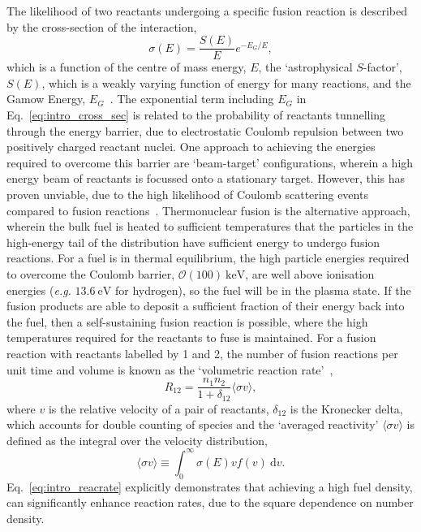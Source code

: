 The likelihood of two reactants undergoing a specific fusion reaction is described by the cross-section of the interaction,
\begin{equation}
    \label{eq:intro_cross_sec}
    \sigma(E) = \frac{S(E)}{E} e^{-E_G/E},
\end{equation}
which is a function of the centre of mass energy, $E$, the `astrophysical $S$-factor', $S(E)$, which is a weakly varying function of energy for many reactions, and the Gamow Energy, $E_G$~\cite{atzeni_physics_2004}.
The exponential term including $E_G$ in Eq.~\ref{eq:intro_cross_sec} is related to the probability of reactants tunnelling through the energy barrier, due to electrostatic Coulomb repulsion between two positively charged reactant nuclei.
One approach to achieving the energies required to overcome this barrier are `beam-target' configurations, wherein a high energy beam of reactants is focussed onto a stationary target.
However, this has proven unviable, due to the high likelihood of Coulomb scattering events compared to fusion reactions~\cite{rider_general_1995}.
Thermonuclear fusion is the alternative approach, wherein the bulk fuel is heated to sufficient temperatures that the particles in the high-energy tail of the distribution have sufficient energy to undergo fusion reactions.
For a fuel is in thermal equilibrium, the high particle energies required to overcome the Coulomb barrier, $\mathcal{O}(100)\ \text{keV}$, are well above ionisation energies (\textit{e.g. }$13.6\ \text{eV}$ for hydrogen), so the fuel will be in the plasma state.
If the fusion products are able to deposit a sufficient fraction of their energy back into the fuel, then a self-sustaining fusion reaction is possible, where the high temperatures required for the reactants to fuse is maintained.
For a fusion reaction with reactants labelled by 1 and 2, the number of fusion reactions per unit time and volume is known as the `volumetric reaction rate'~\cite{atzeni_physics_2004},
\begin{equation}
    \label{eq:intro_reacrate}
    R_{12} = \frac{n_1 n_2}{1+\delta_{12}} \langle \sigma v \rangle,
\end{equation}
where $v$ is the relative velocity of a pair of reactants, $\delta_{12}$ is the Kronecker delta, which accounts for double counting of species and the `averaged reactivity' $\langle \sigma v \rangle$ is defined as the integral over the velocity distribution,
\begin{equation}
    \label{eq:intro_reactivity}
    \langle \sigma v \rangle \equiv \int_0^{\infty} \sigma(E) v f(v)\ \text{d}v.
\end{equation}
Eq.~\ref{eq:intro_reacrate} explicitly demonstrates that achieving a high fuel density, can significantly enhance reaction rates, due to the square dependence on number density.


